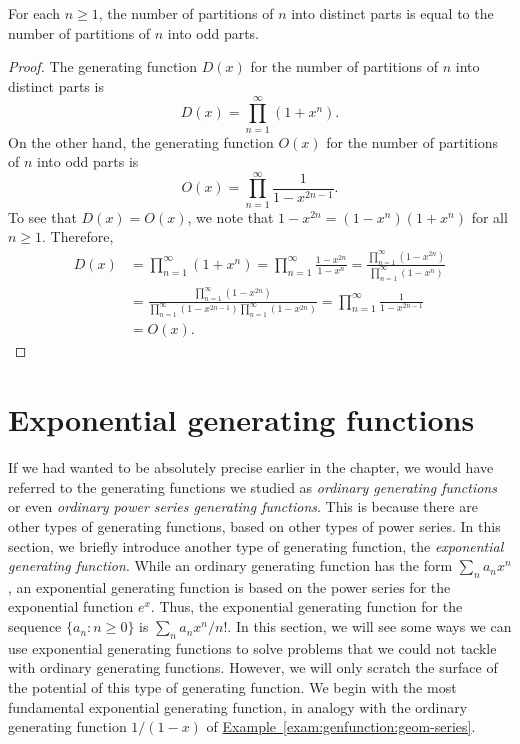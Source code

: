 \begin{theorem}\label{thm:partition}
For each $n\ge1$, the number of partitions of $n$ into distinct parts is
equal to the number of partitions of $n$ into odd parts.
\end{theorem}

\begin{proof}
The generating function $D(x)$ for
the number of partitions of $n$ into distinct parts is
\[
D(x)=\prod_{n=1}^\infty (1+x^n).
\]
On the other hand, the generating function $O(x)$ for the number of partitions
of $n$ into odd parts is
\[
O(x)=\prod_{n=1}^\infty\frac{1}{1-x^{2n-1}}.
\]
To see that $D(x)=O(x)$, we
note that $1-x^{2n}=(1-x^n)(1+x^n)$ for all $n\ge1$.  Therefore,
\begin{align*}
D(x)&=\prod_{n=1}^\infty
(1+x^n)=\prod_{n=1}^\infty\frac{1-x^{2n}}{1-x^n} =\frac{\prod_{n=1}^\infty(1-x^{2n})}{\prod_{n=1}^\infty(1-x^n)}\\
    &=\frac{\prod_{n=1}^\infty(1-x^{2n})}{
       \prod_{n=1}^\infty(1-x^{2n-1})\prod_{n=1}^\infty(1-x^{2n})}
    =\prod_{n=1}^\infty\frac{1}{1-x^{2n-1}}\\
    &= O(x).
\end{align*}
\end{proof}

\section{Exponential generating functions}

If we had wanted to be absolutely precise earlier in the chapter, we
would have referred to the generating functions we studied as
\emph{ordinary generating functions} or even \emph{ordinary power
  series generating functions}. This is because there are other types
of generating functions, based on other types of power series. In this
section, we briefly introduce another type of generating function, the
\emph{exponential generating function}. While an ordinary generating
function has the form $\sum_{n} a_n x^n$, an exponential generating
function is based on the power series for the exponential function
$e^x$. Thus, the exponential generating function for the sequence
$\{a_n\colon n\geq 0\}$ is $\sum_n a_n x^n/n!$. In this section, we
will see some ways we can use exponential generating functions to
solve problems that we could not tackle with ordinary generating
functions. However, we will only scratch the surface of the potential
of this type of generating function. We begin with the most
fundamental exponential generating function, in analogy with the
ordinary generating function $1/(1-x)$ of
\hyperref[exam:genfunction:geom-series]{Example~\ref*{exam:genfunction:geom-series}}.

